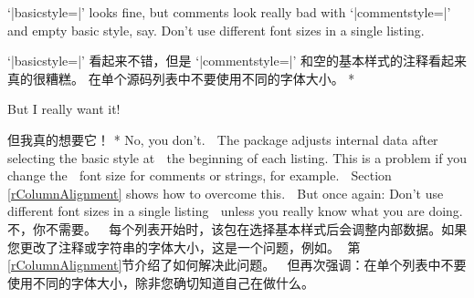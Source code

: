 \begin{advise}
\begin{paracol}{2}
\item `|basicstyle=\small|' looks fine, but comments look really bad with
      `|commentstyle=\tiny|' and empty basic style, say.
      \advisespace
      Don't use different font sizes in a single listing.
\switchcolumn
\item `|basicstyle=\small|' 看起来不错，但是 `|commentstyle=\tiny|' 和空的基本样式的注释看起来真的很糟糕。
\advisespace
在单个源码列表中不要使用不同的字体大小。
\switchcolumn[0]*
\item But I really want it!
\switchcolumn
\item 但我真的想要它！
      \advisespace
\switchcolumn[0]*
      No, you don't.
^^A       The package adjusts internal data after selecting the basic style at
^^A       the beginning of each listing. This is a problem if you change the
^^A       font size for comments or strings, for example.
^^A       Section \ref{rColumnAlignment} shows how to overcome this.
^^A       But once again: Don't use different font sizes in a single listing
^^A       unless you really know what you are doing.
\switchcolumn
不，你不需要。
^^A 每个列表开始时，该包在选择基本样式后会调整内部数据。如果您更改了注释或字符串的字体大小，这是一个问题，例如。
^^A 第\ref{rColumnAlignment}节介绍了如何解决此问题。
^^A 但再次强调：在单个列表中不要使用不同的字体大小，除非您确切知道自己在做什么。
\end{paracol}
\end{advise}


